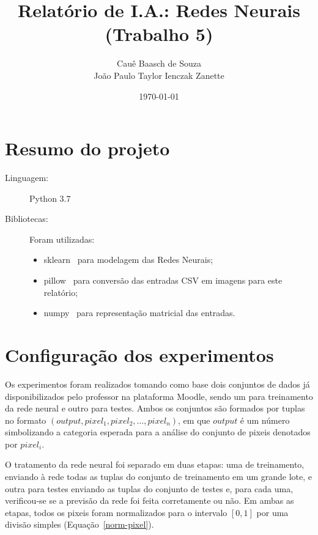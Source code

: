 \documentclass[twocolumn]{article}
\title{Relatório de I.A.: Redes Neurais (Trabalho 5)}
\author{Cauê Baasch de Souza \\
        João Paulo Taylor Ienczak Zanette}
\date{\today}
\begin{document}
    \maketitle{}

    \section{Resumo do projeto}

    \begin{description}
        \item [Linguagem:] Python 3.7
        \item [Bibliotecas:] Foram utilizadas:


            \begin{itemize}
                \item sklearn~\cite{sklearn} para modelagem das Redes Neurais;
                \item pillow~\cite{pillow} para conversão das entradas CSV em
                    imagens para este relatório;
                \item numpy~\cite{numpy} para representação matricial das
                    entradas.
            \end{itemize}
    \end{description}

    \section{Configuração dos experimentos}

    Os experimentos foram realizados tomando como base dois conjuntos de dados
    já disponibilizados pelo professor na plataforma Moodle, sendo um para
    treinamento da rede neural e outro para testes. Ambos os conjuntos são
    formados por tuplas no formato $(output, pixel_1, pixel_2, \ldots,
    pixel_n)$, em que $output$ é um número simbolizando a categoria esperada
    para a análise do conjunto de pixeis denotados por $pixel_{i}$.

    O tratamento da rede neural foi separado em duas etapas: uma de
    treinamento, enviando à rede todas as tuplas do conjunto de treinamento em
    um grande lote, e outra para testes enviando as tuplas do conjunto de
    testes e, para cada uma, verificou-se se a previsão da rede foi feita
    corretamente ou não. Em ambas as etapas, todos os pixeis foram normalizados
    para o intervalo $[0, 1]$ por uma divisão simples
    (Equação~\ref{norm-pixel}).
\end{document}
